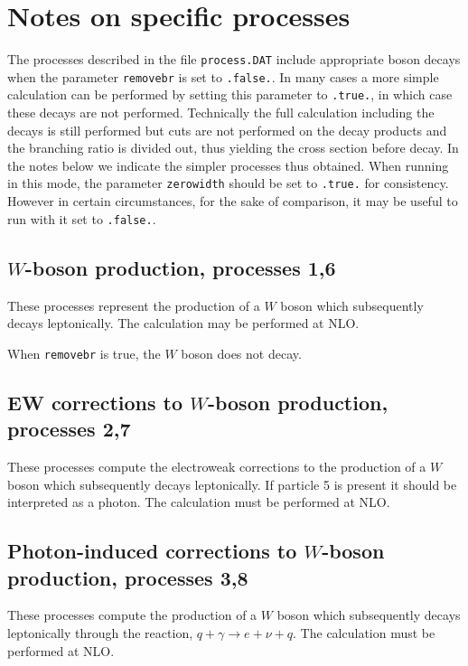 \section{Notes on specific processes}

\label{sec:specific}

The processes described in the file {\tt process.DAT} include appropriate boson decays when the parameter 
{\tt removebr} is set to {\tt .false.}. In many cases a more simple calculation can be performed by setting 
this parameter to {\tt .true.}, in which case these decays are not performed.
Technically the full calculation including the decays
is still performed but cuts are not performed on the decay products and the
branching ratio is divided out, thus yielding the cross section before decay.
In the notes below we indicate the simpler processes thus obtained. When running in
this mode, the parameter {\tt zerowidth} should be set to {\tt .true.} for consistency. However in certain 
circumstances, for the sake of comparison, it may be useful to run with it set to {\tt .false.}.

\subsection{$W$-boson production, processes 1,6}
\label{subsec:wboson}

These processes represent the production of a $W$ boson which subsequently
decays leptonically. The calculation may be performed at NLO.

When {\tt removebr} is true, the $W$ boson does not decay.

\subsection{EW corrections to $W$-boson production, processes 2,7}
\label{subsec:wbosonew}

These processes compute the electroweak corrections to the production of
a $W$ boson which subsequently decays leptonically.  If particle 5 is present
it should be interpreted as a photon.
The calculation must be performed at NLO.

\subsection{Photon-induced corrections to $W$-boson production, processes 3,8}
\label{subsec:wbosonphoton}

These processes compute the production of
a $W$ boson which subsequently decays leptonically through the reaction,
$q + \gamma \to e + \nu + q$.
The calculation must be performed at NLO.

